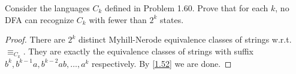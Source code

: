 \begin{exercise}
  Consider the languages $C_k$ defined in Problem 1.60. Prove that for each $k$, no DFA can recognize $C_k$ with fewer than $2^k$ states.
\end{exercise}

\begin{proof}
  There are $2^k$ distinct Myhill-Nerode equivalence classes of strings w.r.t. $\equiv_{C_k}$. They are exactly the equivalence classes of strings with suffix $b^k, b^{k-1}a,b^{k-2}ab,\dots,a^k$ respectively. By \ref{1.52} we are done.
\end{proof}

